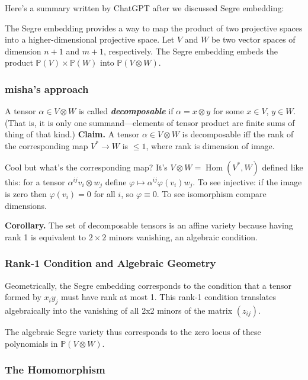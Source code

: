 Here's a summary written by ChatGPT after we discussed Segre embedding:

The Segre embedding provides a way to map the product of two projective spaces into a higher-dimensional projective space. Let \( V \) and \( W \) be two vector spaces of dimension \( n+1 \) and \( m+1 \), respectively. The Segre embedding embeds the product \( \mathbb{P}(V) \times \mathbb{P}(W) \) into \( \mathbb{P}(V \otimes W) \).

\subsubsection*{misha's approach}

A tensor \(\alpha \in V \otimes W\) is called \textit{\textbf{decomposable}} if  \(\alpha=x \otimes y \) for some \(x \in V\), \(y \in W\). (That is, it is only one summand---elements of tensor product are finite sums of thing of that kind.) \textbf{Claim.} A tensor \(\alpha \in V \otimes W\) is decomposable iff the rank of the corresponding map \(V^* \to W\) is \(\leq 1\), where rank is dimension of image.

Cool but what's the corresponding map? It's \(V \otimes W =\operatorname{Hom}(V^*,W)\) defined like this: for a tensor \(\alpha^{ij}v_i \otimes w_j\) define \(\varphi \mapsto \alpha^{ij}\varphi(v_i)w_j\). To see injective: if the image is zero then \(\varphi(v_i)=0\) for all \(i\), so \(\varphi\equiv 0\). To see isomorphism compare dimensions.

\textbf{Corollary.} The set of decomposable tensors is an affine variety because having rank 1 is equivalent to \(2 \times 2\) minors vanishing, an algebraic condition. 

\subsubsection*{Rank-1 Condition and Algebraic Geometry}

Geometrically, the Segre embedding corresponds to the condition that a tensor formed by \( x_i y_j \) must have rank at most 1. This rank-1 condition translates algebraically into the vanishing of all 2x2 minors of the matrix \( (z_{ij}) \).

The algebraic Segre variety thus corresponds to the zero locus of these polynomials in \( \mathbb{P}(V \otimes W) \).


\subsubsection*{The Homomorphism}

